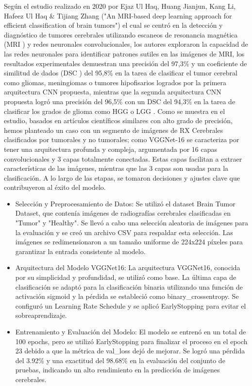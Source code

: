 \documentclass[12pt,twoside,titlepage]{ingenius}
\begin{document}
\begin{multicols}{2}
Según el estudio realizado en 2020 por Ejaz Ul Haq, Huang Jianjun, Kang Li, Hafeez Ul Haq \& Tijiang Zhang ("An MRI-based deep learning approach for efficient classification of brain tumors") \cite{17} el cual se centró en la detección y diagnóstico de tumores cerebrales utilizando escaneos de resonancia magnética (MRI ) y redes neuronales convolucionales, los autores exploraron la capacidad de las redes neuronales para identificar patrones sutiles en las imágenes de MRI, los resultados experimentales demuestran una precisión del 97,3\% y un coeficiente de similitud de dados (DSC ) del 95,8\% en la tarea de clasificar el tumor cerebral como gliomas, meningiomas o tumores hipofisarios logrados por la primera arquitectura CNN propuesta, mientras que la segunda arquitectura CNN propuesta logró una precisión del 96,5\% con un DSC del 94,3\% en la tarea de clasificar los grados de glioma como HGG  o LGG . 
Como se muestra en el estudio, basados en artículos científicos similares con alto grado de precisión, hemos planteado un caso con un segmento de imágenes de RX Cerebrales clasificados por tumorales y no tumorales; como VGGNet-16 se caracteriza por tener una arquitectura profunda y compleja, argumentada por 16 capas convolucionales y 3 capas totalmente conectadas. Estas capas facilitan a extraer características de las imágenes, mientras que las 3 capas son usadas para la clasificación. 
A lo largo de las etapas, se tomaron decisiones y ajustes clave que contribuyeron al éxito del modelo.
\begin{itemize}
	\item Selección y Preprocesamiento de Datos: Se utilizó el dataset Brain Tumor Dataset, que contenía imágenes de radiografías cerebrales clasificadas en "Tumor" y "Healthy". Se llevó a cabo una selección aleatoria de imágenes para la evaluación y se creó un archivo CSV para respaldar esta selección. Las imágenes se redimensionaron a un tamaño uniforme de 224x224 píxeles para garantizar la entrada consistente al modelo.
	\item Arquitectura del Modelo VGGNet16: La arquitectura VGGNet16, conocida por su simplicidad y profundidad, se utilizó como base. La última capa de clasificación se adaptó para la clasificación binaria utilizando una función de activación sigmoid y la pérdida se estableció como binary\_crossentropy. Se configuró un Learning Rate Schedule y se aplicó EarlyStopping para evitar el sobreaprendizaje.
	\item Entrenamiento y Evaluación del Modelo: El modelo se entrenó en un total de 100 epochs, pero se utilizó EarlyStopping para finalizar el proceso en el epoch 23 debido a que la métrica de val\_loss dejó de mejorar. Se logró una pérdida del 3.92\% y una exactitud del 98.68\% en la evaluación del conjunto de pruebas, indicando un alto rendimiento en la predicción de imágenes cerebrales.
\end{itemize}


\end{multicols}
\end{document}
